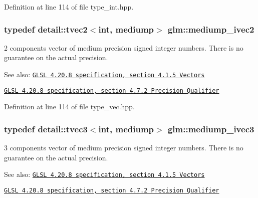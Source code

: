 Definition at line 114 of file type\_\-int.hpp.\hypertarget{group__core__precision_g4f1bf9844e667805235823afe809aa73}{
\subsubsection[mediump\_\-ivec2]{\setlength{\rightskip}{0pt plus 5cm}typedef detail::tvec2$<$int, mediump$>$ {\bf glm::mediump\_\-ivec2}}}
\label{group__core__precision_g4f1bf9844e667805235823afe809aa73}


2 components vector of medium precision signed integer numbers. There is no guarantee on the actual precision.

\begin{Desc}
\item[See also:]\href{http://www.opengl.org/registry/doc/GLSLangSpec.4.20.8.pdf}{\tt GLSL 4.20.8 specification, section 4.1.5 Vectors} 

\href{http://www.opengl.org/registry/doc/GLSLangSpec.4.20.8.pdf}{\tt GLSL 4.20.8 specification, section 4.7.2 Precision Qualifier} \end{Desc}


Definition at line 114 of file type\_\-vec.hpp.\hypertarget{group__core__precision_g520d24fa0ea887284b80a02c062ca7b8}{
\subsubsection[mediump\_\-ivec3]{\setlength{\rightskip}{0pt plus 5cm}typedef detail::tvec3$<$int, mediump$>$ {\bf glm::mediump\_\-ivec3}}}
\label{group__core__precision_g520d24fa0ea887284b80a02c062ca7b8}


3 components vector of medium precision signed integer numbers. There is no guarantee on the actual precision.

\begin{Desc}
\item[See also:]\href{http://www.opengl.org/registry/doc/GLSLangSpec.4.20.8.pdf}{\tt GLSL 4.20.8 specification, section 4.1.5 Vectors} 

\href{http://www.opengl.org/registry/doc/GLSLangSpec.4.20.8.pdf}{\tt GLSL 4.20.8 specification, section 4.7.2 Precision Qualifier} \end{Desc}


